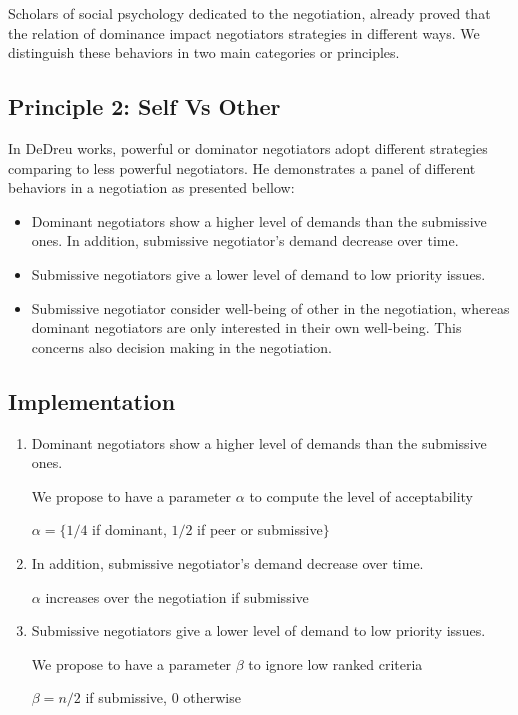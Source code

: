 \documentclass{llncs}
\begin{document}
\par Scholars of social psychology dedicated to the negotiation, already proved that the relation of dominance impact negotiators strategies in different ways. We distinguish these behaviors in two main categories or principles.
\subsection{Principle 2: Self Vs Other}
In DeDreu works, powerful or dominator negotiators adopt different strategies comparing to less powerful negotiators. He demonstrates a panel of different behaviors in a negotiation as presented bellow:
\begin{itemize}
	\item Dominant negotiators show a higher level of demands than the submissive ones. In addition, submissive negotiator's demand decrease over time. 
	\item Submissive negotiators give a lower level of demand to low priority issues.
	\item Submissive negotiator consider well-being of other in the negotiation, whereas dominant negotiators are only interested in their own well-being. This concerns also decision making in the negotiation. 
\end{itemize}  

\subsection{Implementation}
\begin{enumerate}
	\item Dominant negotiators show a higher level of demands than the submissive ones.
	
	We propose to have a parameter $\alpha$ to compute the level of acceptability
	
	$\alpha = \{ 1/4$ if dominant, $1/2$ if peer or submissive$\}$ 
	
	\item In addition, submissive negotiator's demand decrease over time. 
	
	$ \alpha$ increases over the negotiation if submissive
	
	\item Submissive negotiators give a lower level of demand to low priority issues.
	
	We propose to have a parameter $\beta$ to ignore low ranked criteria 
	
	$\beta = n/2$ if submissive, $0$ otherwise
\end{enumerate}
\end{document}
